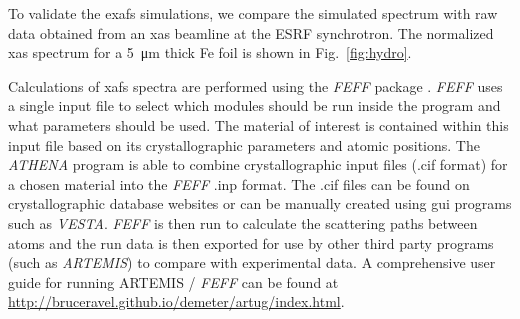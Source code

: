 To validate the \gls{exafs} simulations, we compare the simulated spectrum with raw
data obtained from an \gls{xas} beamline at the ESRF synchrotron. The
normalized \gls{xas} spectrum for a \SI{5}{\micro\metre} thick Fe foil is shown in
Fig.~\ref{fig:hydro}.
%
\begin{figure}
\end{figure}
%
Calculations of \gls{xafs} spectra are performed using the \textit{FEFF} package
\cite{Rehr2009}. \textit{FEFF} uses a
single input file to select which modules should be run inside the program and
what parameters should be used. The material of interest is contained within
this input file based on its crystallographic parameters and atomic positions.
The \textit{ATHENA} program is able to combine crystallographic input files (.cif format)
for a chosen material into the \textit{FEFF} .inp format. The .cif files can be
found on crystallographic database websites or can be manually created
using gui programs such as \textit{VESTA}. \textit{FEFF} is then run to
calculate the scattering paths
between atoms and the run data is then exported for use by other third party programs
(such as \textit{ARTEMIS}) to compare with experimental data.
A comprehensive user guide for running ARTEMIS
/ \textit{FEFF} can be found at\\
\href{http://bruceravel.github.io/demeter/artug/index.html}{http://bruceravel.github.io/demeter/artug/index.html}.
%
